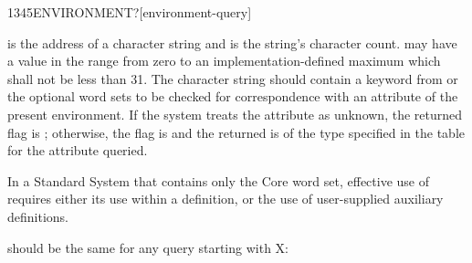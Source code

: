 \begin{worddef}[ENVIRONMENTq]{1345}{ENVIRONMENT?}[environment-query]
\item {}

	 is the address of a character string and 
	is the string's character count.  may have a value in
	the range from zero to an implementation-defined maximum which
	shall not be less than 31. The character string should contain a
	keyword from  or the
	optional word sets to be checked for correspondence with an
	attribute of the present environment. If the system treats the
	attribute as unknown, the returned flag is ;
	otherwise, the flag is  and the  returned
	is of the type specified in the table for the attribute queried.

	\begin{rationale} %
		In a Standard System that contains only the Core word set,
		effective use of  requires either its use
		within a definition, or the use of user-supplied auxiliary
		definitions.
	\end{rationale}

	\begin{testing} %
		 should be the same for any query starting with X: \\
		 \\
	\end{testing}
\end{worddef}


